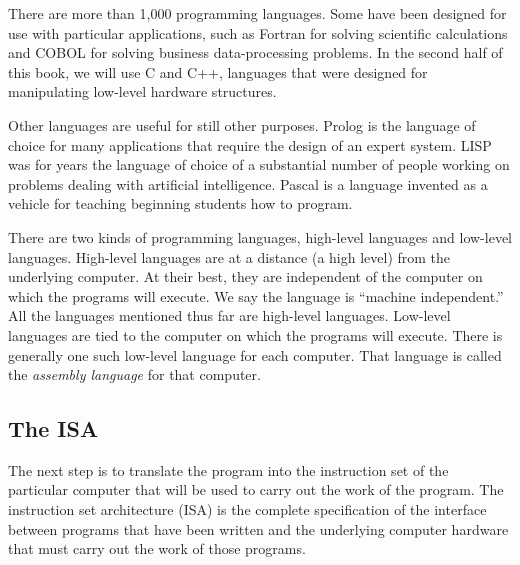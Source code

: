\documentclass{patt}
\begin{document}
There are more than 1{,}000 programming languages.  Some have been
designed for use with particular applications, such as Fortran for solving
scientific calculations and COBOL for solving business data-processing 
problems.  In the second half of this book, we will use C and C++, languages 
that were designed for manipulating low-level hardware structures.

Other languages are useful for still other purposes.  Prolog is the language
of choice for many applications that require the design of an expert system.
LISP was for years the language of choice of a substantial number of
people working on problems dealing with artificial intelligence.  Pascal is
a language invented as a vehicle for teaching beginning students how to
program.

There are two kinds of programming languages, high-level languages
and low-level
languages.  High-level languages are at a distance (a high level) from
the underlying computer.  At their best, they are independent of
the computer on which the programs will execute.  We say the language
is ``machine independent.''
All the languages mentioned thus far are high-level languages.
Low-level languages are tied to the computer on which the programs
will execute.  There is generally one such low-level language
for each computer.  That language is called the {\em assembly
language} for that computer.

\subsection{The ISA}

The next step is to translate the program into the instruction set of 
the particular computer that will be used to carry out the work of the 
program.  The instruction set architecture (ISA)
is the complete specification of
the interface between programs that have been written and the underlying
computer hardware that must carry out the work of those programs.
\end{document}
